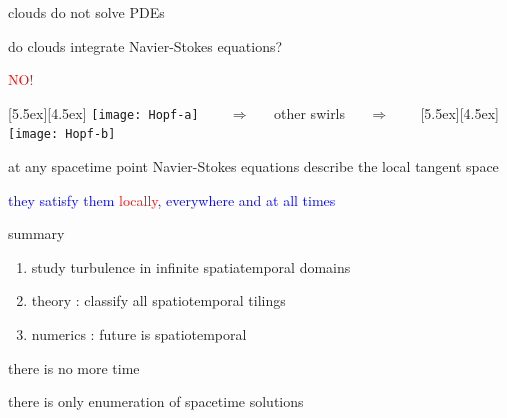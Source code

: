 \begin{frame}{clouds do not solve PDEs}

do clouds integrate Navier-Stokes equations?

\begin{center}
\centerline{\textcolor{red}{\Huge NO!}}

\begin{minipage}[t]{\textwidth}
	\begin{center}
\centerline{
\raisebox{-4.0ex}[5.5ex][4.5ex]
		 {\texttt{[image: Hopf-a]}}
~~~ $\Longrightarrow$ ~~ {other swirls} ~~ $\Longrightarrow$ ~~~
	\raisebox{-4.0ex}[5.5ex][4.5ex]
		 {\texttt{[image: Hopf-b]}}
          }
	\end{center}
\end{minipage}
\end{center}

at any spacetime point Navier-Stokes equations describe the local tangent space

\bigskip

\centerline{
\textcolor{blue}{they satisfy them \textcolor{red}{\large locally}, everywhere and at all times}
}
\end{frame}


\begin{frame}{summary}
\begin{enumerate}
              \item
study turbulence in infinite spatiatemporal domains
              \item
theory : classify all spatiotemporal tilings
              \item
numerics : future is spatiotemporal
\end{enumerate}

\vfill

there is no more time

\medskip

there is only enumeration of spacetime solutions
\end{frame}


